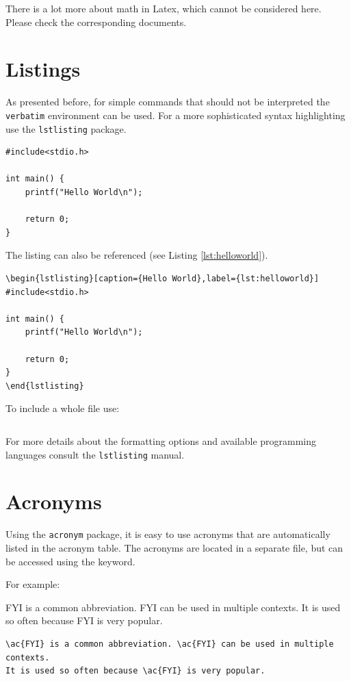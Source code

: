 There is a lot more about math in Latex, which cannot be considered here. Please check the corresponding documents.

\section{Listings}
As presented before, for simple commands that should not be interpreted the \texttt{verbatim} environment can be used. For a more sophisticated syntax highlighting use the \texttt{lstlisting} package.

\begin{lstlisting}[caption={Hello World},label={lst:helloworld}]
#include<stdio.h>

int main() {
    printf("Hello World\n");

    return 0;
}
\end{lstlisting}

The listing can also be referenced (see Listing \ref{lst:helloworld}).

\begin{verbatim}
\begin{lstlisting}[caption={Hello World},label={lst:helloworld}]
#include<stdio.h>

int main() {
    printf("Hello World\n");

    return 0;
}
\end{lstlisting}
\end{verbatim}

To include a whole file use:
\begin{verbatim}

\end{verbatim}

For more details about the formatting options and available programming languages consult the \texttt{lstlisting} manual.


\section{Acronyms}
Using the \texttt{acronym} package, it is easy to use acronyms that are automatically listed in the acronym table. The acronyms are located in a separate file, but can be accessed using the keyword.

For example:

\ac{FYI} is a common abbreviation. \ac{FYI} can be used in multiple contexts.
It is used so often because \ac{FYI} is very popular.

\begin{verbatim}
\ac{FYI} is a common abbreviation. \ac{FYI} can be used in multiple contexts.
It is used so often because \ac{FYI} is very popular.
\end{verbatim}


